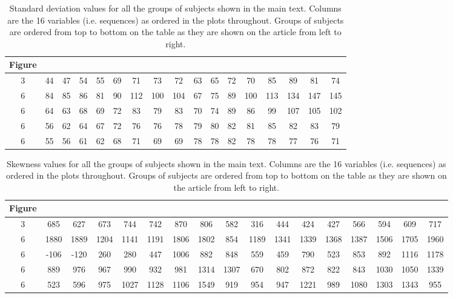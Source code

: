 \documentclass[12pt,letterpaper]{article}
\begin{document}
\clearpage

\begin{table}[t]
\centering
\begin{adjustbox}{width=1\textwidth}
\begin{tabular}{c|cccccccccccccccc}
Figure & \\
\hline
3 & 44 & 47 & 54 & 55 & 69 & 71 & 73 & 72 & 63 & 65 & 72 & 70 & 85 & 89 & 81 & 74 \\ \hline
6 & 84 & 85 & 86 & 81 & 90 & 112 & 100 & 104 & 67 & 75 & 89 & 100 & 113 & 134 & 147 & 145 \\ 
6 & 64 & 63 & 68 & 69 & 72 & 83 & 79 & 83 & 70 & 74 & 89 & 86 & 99 & 107 & 105 & 102 \\ 
6 & 56 & 62 & 64 & 67 & 72 & 76 & 76 & 78 & 79 & 80 & 82 & 81 & 85 & 82 & 83 & 79 \\ 
6 & 55 & 56 & 61 & 62 & 68 & 71 & 69 & 69 & 78 & 78 & 82 & 78 & 78 & 77 & 76 & 71 \\ 
\end{tabular}
\end{adjustbox}
\caption[]{Standard deviation values for all the groups of subjects shown in the main text. Columns are the 16 variables (i.e. sequences) as ordered in the plots throughout. Groups of subjects are ordered from top to bottom on the table as they are shown on the article from left to right.}
\end{table}

\clearpage

\begin{table}[t]
\centering
\begin{adjustbox}{width=1\textwidth}
\begin{tabular}{c|cccccccccccccccc}
Figure & \\
\hline
3 & 685 & 627 & 673 & 744 & 742 & 870 & 806 & 582 & 316 & 444 & 424 & 427 & 566 & 594 & 609 & 717 \\ \hline
6 & 1880 & 1889 & 1204 & 1141 & 1191 & 1806 & 1802 & 854 & 1189 & 1341 & 1339 & 1368 & 1387 & 1506 & 1705 & 1960 \\ 
6 & -106 & -120 & 260 & 280 & 447 & 1006 & 882 & 848 & 559 & 459 & 790 & 523 & 853 & 892 & 1116 & 1178 \\ 
6 & 889 & 976 & 967 & 990 & 932 & 981 & 1314 & 1307 & 670 & 802 & 872 & 822 & 843 & 1030 & 1050 & 1339 \\ 
6 & 523 & 596 & 975 & 1027 & 1128 & 1106 & 1549 & 919 & 954 & 947 & 1221 & 989 & 1080 & 1303 & 1343 & 955 \\ 
\end{tabular}
\end{adjustbox}
\caption[]{Skewness values for all the groups of subjects shown in the main text. Columns are the 16 variables (i.e. sequences) as ordered in the plots throughout. Groups of subjects are ordered from top to bottom on the table as they are shown on the article from left to right.}
\end{table}
\end{document}
